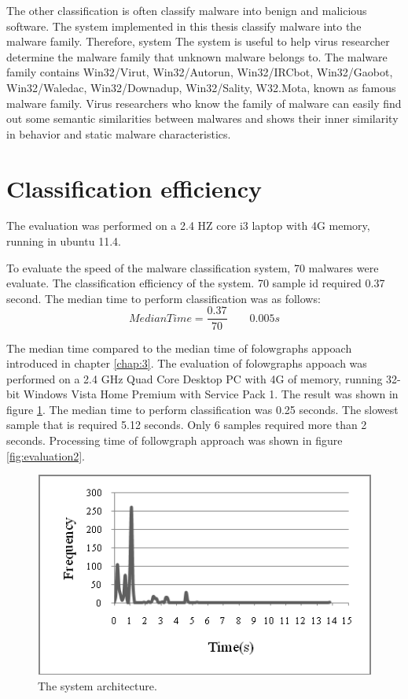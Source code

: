 The other classification is often classify malware into benign and malicious software. The system implemented in this thesis classify malware into the malware family. Therefore, system The system is useful to help virus researcher determine the malware family that unknown malware belongs to. The malware family contains Win32/Virut, Win32/Autorun, Win32/IRCbot, Win32/Gaobot, Win32/Waledac, Win32/Downadup, Win32/Sality, W32.Mota, known as famous malware family. Virus researchers who know the family of malware can easily find out some semantic similarities between malwares and shows their inner similarity in behavior and static malware characteristics.

\section{Classification efficiency}
The evaluation was performed on a 2.4 HZ core i3 laptop with 4G memory, running in ubuntu 11.4. 	

To evaluate the speed of the malware classification system, 70 malwares were evaluate. The classification efficiency of the system. 70 sample id required 0.37 second. The median time to perform classification was as follows: 
\begin{equation}
MedianTime=\frac{0.37}{70}\qquad0.005 s
\end{equation}

The median time compared to the median time of folowgraphs appoach introduced in chapter \ref{chap:3}. The evaluation of  folowgraphs appoach was performed on a 2.4 GHz Quad Core Desktop PC with 4G of memory, running 32-bit Windows Vista Home Premium with Service Pack 1\cite{silvio}. The result was shown in figure \ref{fig:evaluation1}. The median time to perform classification was 0.25 seconds. The slowest sample that is required 5.12 seconds. Only 6 samples required more than 2 seconds. Processing time of followgraph approach was shown in figure \ref{fig:evaluation2}.
\begin{figure}[h!]
\centering
\includegraphics[width=1\textwidth]
{graph/evaluation1.png}
\caption{The system architecture.}
\label{fig:evaluation1}
\end{figure}

